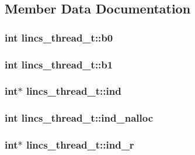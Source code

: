 \subsection{\-Member \-Data \-Documentation}
\hypertarget{structlincs__thread__t_acd5a6c85306dcd71344d4a2afcedeca5}{
\subsubsection[{b0}]{\setlength{\rightskip}{0pt plus 5cm}int {\bf lincs\-\_\-thread\-\_\-t\-::b0}}}\label{structlincs__thread__t_acd5a6c85306dcd71344d4a2afcedeca5}
\hypertarget{structlincs__thread__t_adb9ecb99a3586f8d0cbce27cf199046f}{
\subsubsection[{b1}]{\setlength{\rightskip}{0pt plus 5cm}int {\bf lincs\-\_\-thread\-\_\-t\-::b1}}}\label{structlincs__thread__t_adb9ecb99a3586f8d0cbce27cf199046f}
\hypertarget{structlincs__thread__t_a5f3504040a144e1ae1334236b596446d}{
\subsubsection[{ind}]{\setlength{\rightskip}{0pt plus 5cm}int$\ast$ {\bf lincs\-\_\-thread\-\_\-t\-::ind}}}\label{structlincs__thread__t_a5f3504040a144e1ae1334236b596446d}
\hypertarget{structlincs__thread__t_a22e5bdea5f89c186bb1af256e97115d6}{
\subsubsection[{ind\-\_\-nalloc}]{\setlength{\rightskip}{0pt plus 5cm}int {\bf lincs\-\_\-thread\-\_\-t\-::ind\-\_\-nalloc}}}\label{structlincs__thread__t_a22e5bdea5f89c186bb1af256e97115d6}
\hypertarget{structlincs__thread__t_a81a42aca24c5e27a3ce6c1fe1cfc1843}{
\subsubsection[{ind\-\_\-r}]{\setlength{\rightskip}{0pt plus 5cm}int$\ast$ {\bf lincs\-\_\-thread\-\_\-t\-::ind\-\_\-r}}}\label{structlincs__thread__t_a81a42aca24c5e27a3ce6c1fe1cfc1843}
